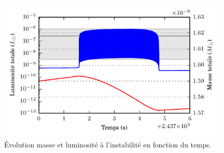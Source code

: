 \documentclass[french]{beamer}
\begin{document}
\begin{frame}
  
  \begin{figure}
    \includegraphics{figures/Ltot_et_Mtot_fonction_t_zoom.pdf}
    \caption{Évolution masse et luminosité à l'instabilité en fonction du temps.}
  \end{figure}  
\end{frame}


\end{document}
